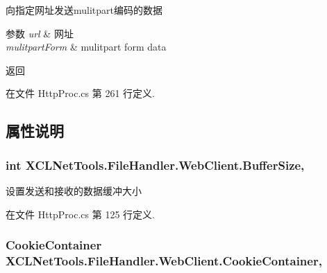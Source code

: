 向指定网址发送mulitpart编码的数据 


\begin{DoxyParams}{参数}
{\em url} & 网址\\
\hline
{\em mulitpart\+Form} & mulitpart form data\\
\hline
\end{DoxyParams}
\begin{DoxyReturn}{返回}

\end{DoxyReturn}


在文件 Http\+Proc.\+cs 第 261 行定义.



\subsection{属性说明}
\subsubsection[{\texorpdfstring{Buffer\+Size}{BufferSize}}]{\setlength{\rightskip}{0pt plus 5cm}int X\+C\+L\+Net\+Tools.\+File\+Handler.\+Web\+Client.\+Buffer\+Size\hspace{0.3cm}{\ttfamily [get]}, {\ttfamily [set]}}\hypertarget{class_x_c_l_net_tools_1_1_file_handler_1_1_web_client_a192f27c95b8274758ca9d68c620de7c3}{}\label{class_x_c_l_net_tools_1_1_file_handler_1_1_web_client_a192f27c95b8274758ca9d68c620de7c3}


设置发送和接收的数据缓冲大小 



在文件 Http\+Proc.\+cs 第 125 行定义.

\subsubsection[{\texorpdfstring{Cookie\+Container}{CookieContainer}}]{\setlength{\rightskip}{0pt plus 5cm}Cookie\+Container X\+C\+L\+Net\+Tools.\+File\+Handler.\+Web\+Client.\+Cookie\+Container\hspace{0.3cm}{\ttfamily [get]}, {\ttfamily [set]}}\hypertarget{class_x_c_l_net_tools_1_1_file_handler_1_1_web_client_adeaa1201074e43df3743d76ea77cf06e}{}\label{class_x_c_l_net_tools_1_1_file_handler_1_1_web_client_adeaa1201074e43df3743d76ea77cf06e}


